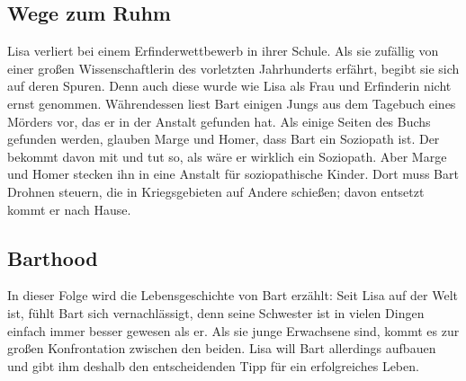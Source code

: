 
\subsection{Wege zum Ruhm}
Lisa verliert bei einem Erfinderwettbewerb in ihrer Schule. Als sie zufällig von einer großen Wissenschaftlerin des vorletzten Jahrhunderts erfährt, begibt sie sich auf deren Spuren. Denn auch diese wurde wie Lisa als Frau und Erfinderin nicht ernst genommen. Währendessen liest Bart einigen Jungs aus dem Tagebuch eines Mörders vor, das er in der Anstalt gefunden hat. Als einige Seiten des Buchs gefunden werden, glauben Marge und Homer, dass Bart ein Soziopath ist. Der bekommt davon mit und tut so, als wäre er wirklich ein Soziopath. Aber Marge und Homer stecken ihn in eine Anstalt für soziopathische Kinder. Dort muss Bart Drohnen steuern, die in Kriegsgebieten auf Andere schießen; davon entsetzt kommt er nach Hause.


\subsection{Barthood}\label{VABF02}
In dieser Folge wird die Lebensgeschichte von Bart erzählt: Seit Lisa auf der Welt ist, fühlt Bart sich vernachlässigt, denn seine Schwester ist in vielen Dingen einfach immer besser gewesen als er. Als sie junge Erwachsene sind, kommt es zur großen Konfrontation zwischen den beiden. Lisa will Bart allerdings aufbauen und gibt ihm deshalb den entscheidenden Tipp für ein erfolgreiches Leben.


